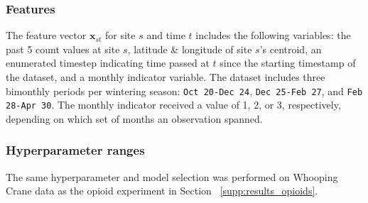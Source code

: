 
\subsubsection{Features}
\label{supp:features_birds}

The feature vector $\bm{x}_{st}$ for site $s$ and time $t$ includes the following variables: the past 5 count values at site $s$, latitude \& longitude of site $s$'s centroid, an enumerated timestep indicating time passed at $t$ since the starting timestamp of the dataset, and a monthly indicator variable. The dataset includes three bimonthly periods per wintering season: \texttt{Oct 20-Dec 24}, \texttt{Dec 25-Feb 27}, and \texttt{Feb 28-Apr 30}. The monthly indicator received a value of 1, 2, or 3, respectively, depending on which set of months an observation spanned. 

\subsubsection{Hyperparameter ranges}


The same hyperparameter and model selection was performed on Whooping Crane data as the opioid experiment in Section ~\ref{supp:results_opioids}.